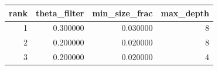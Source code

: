 \begin{tabular}{rrrr}
\toprule
rank & theta_filter & min_size_frac & max_depth \\
\midrule
1 & 0.300000 & 0.030000 & 8 \\
2 & 0.200000 & 0.020000 & 8 \\
3 & 0.200000 & 0.020000 & 4 \\
\bottomrule
\end{tabular}
